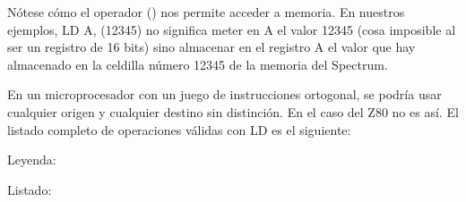 \documentclass[letterpaper,10pt,spanish]{sphinxmanual}
\begin{document}
\begin{sphinxVerbatim}[commandchars=\\\{\}]
      
         
\end{sphinxVerbatim}

Nótese cómo el operador () nos permite acceder a memoria. En nuestros ejemplos, LD A, (12345) no significa meter en A el valor 12345 (cosa imposible al ser un registro de 16 bits) sino almacenar en el registro A el valor que hay almacenado en la celdilla número 12345 de la memoria del Spectrum.

En un microprocesador con un juego de instrucciones ortogonal, se podría usar cualquier origen y cualquier destino sin distinción. En el caso del Z80 no es así. El listado completo de operaciones válidas con LD es el siguiente:

Leyenda:

\begin{sphinxVerbatim}[commandchars=\\\{\}]
         
        
             
         
      
        
\end{sphinxVerbatim}

Listado:
\end{document}
